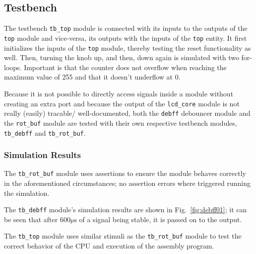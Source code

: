 \documentclass[a4paper,10pt]{scrartcl}
\begin{document}






\subsection{Testbench}
\label{sec:bench}


The testbench \texttt{tb\_top} module is connected with its inputs to
the outputs of the \texttt{top} module and vice-versa, its outputs
with the inputs of the \texttt{top} entity.  It first initializes the
inputs of the \texttt{top} module, thereby testing the reset
functionality as well.  Then, turning the knob up, and then, down
again is simulated with two for-loops.  Important is that the counter
does not overflow when reaching the maximum value of 255 and that it
doesn't underflow at 0.

Because it is not possible to directly access signals inside a module
without creating an extra port and because the output of the
\texttt{lcd\_core} module is not really (easily) tracable/
well-documented, both the \texttt{debff} debouncer module and the
\texttt{rot\_buf} module are tested with their own respective
testbench modules, \texttt{tb\_debff} and \texttt{tb\_rot\_buf}.









\subsubsection{Simulation Results}

The \texttt{tb\_rot\_buf} module uses assertions to ensure the module behaves correctly in the aforementioned circumstances; 
no assertion errors where triggered running the simulation.

The \texttt{tb\_debff} module's simulation results are shown in Fig.\ \ref{fig:debff01}; 
it can be seen that after $600 \mathrm{\mu s}$ of a signal being stable, it is passed on to the output.

The \texttt{tb\_top} module uses similar stimuli as the \texttt{tb\_rot\_buf} module to test the correct behavior of the CPU
and execution of the assembly program.
\end{document}
